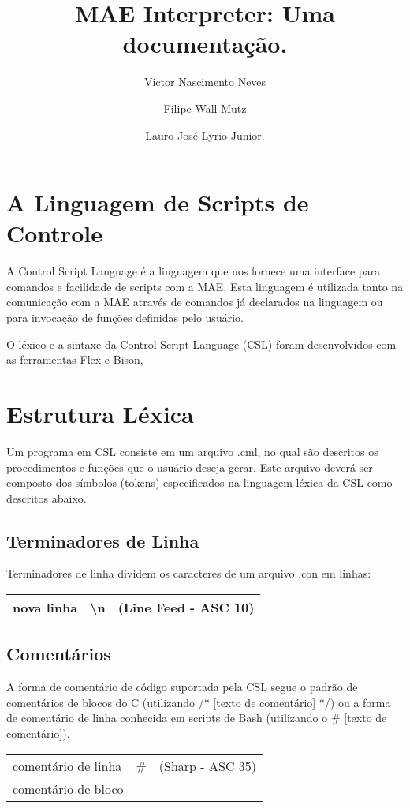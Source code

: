 \documentclass[a4paper,10pt]{article}
\title{MAE Interpreter: Uma documenta\c{c}\~{a}o.}
\author{Victor Nascimento Neves\and Filipe Wall Mutz\and Lauro Jos\'e Lyrio Junior.}
\begin{document}
\maketitle

\tableofcontents

\section{A Linguagem de Scripts de Controle}
A Control Script Language \'e a linguagem que nos fornece uma interface para comandos e facilidade de scripts com a MAE.
Esta linguagem \'e utilizada tanto na comunica\c{c}\~ao com a MAE atrav\'es de comandos j\'a declarados na linguagem ou para invoca\c{c}\~ao de fun\c{c}\~oes definidas pelo usu\'ario.

O l\'exico e a sintaxe da Control Script Language (CSL) foram desenvolvidos com as ferramentas Flex e Bison,

\section{Estrutura L\'exica}
Um programa em CSL consiste em um arquivo .cml, no qual s\~ao descritos os procedimentos e fun\c{c}\~oes que o usu\'ario deseja gerar.
Este arquivo dever\'a ser composto dos s\'imbolos (tokens) especificados na linguagem l\'exica da CSL como descritos abaixo.

  \subsection{Terminadores de Linha}
  Terminadores de linha dividem os caracteres de um arquivo .con em linhas:
  \begin{center}
    \begin{tabular}{| l | c | r |}
    \hline
    nova linha & \textbackslash n & (Line Feed - ASC 10)\\
    \hline
    \end{tabular}
  \end{center}

  \subsection{Coment\'arios}
  A forma de coment\'ario de c\'odigo suportada pela CSL segue o padr\~ao de coment\'arios de blocos do C (utilizando /* [texto de coment\'ario] */) ou a forma de coment\'ario de linha
  conhecida em scripts de Bash (utilizando o \# [texto de coment\'ario]).
  \begin{center}
    \begin{tabular}{| l | c | r |}
    \hline
    coment\'ario de linha & \# & (Sharp - ASC 35)\\
    coment\'ario de bloco & & \\
    \hline
    \end{tabular}
  \end{center}
\end{document}
